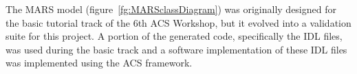 The MARS model (figure~\ref{fg:MARSclassDiagram}) was originally
designed for the
basic tutorial track of the 6th ACS Workshop,
but it evolved into a validation
suite for this project.
A portion of the generated code, specifically the IDL files,
was used during the basic track and a software implementation
of these IDL files
was implemented using the ACS framework.




